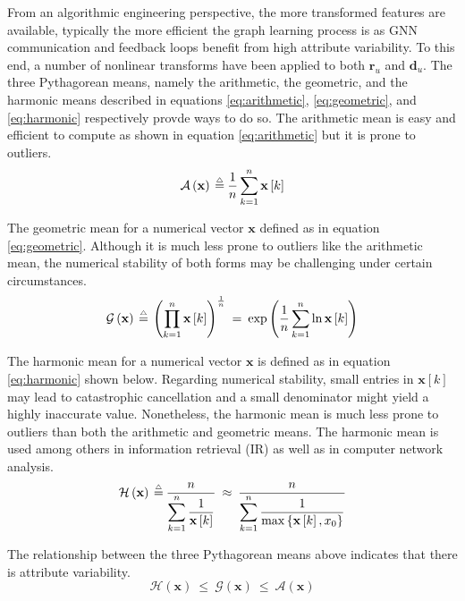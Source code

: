 \documentclass[conference, compsoc, final]{IEEEtran}
\newcommand{\bmdef}{{\buildrel{{\mathsmaller{\triangle}}}\over{=}}}
\newcommand{\bmparen}[1]{\left({#1}\right)}
\newcommand{\bmvec}[1]{\mathbf{#1}}
\newcommand{\bmindex}[1]{\left[{#1}\right]}
\newcommand{\bmAmean}[1]{\mathcal{A}\left(#1\right)}
\newcommand{\bmGmean}[1]{\mathcal{G}\left(#1\right)}
\newcommand{\bmHmean}[1]{\mathcal{H}\left(#1\right)}
\begin{document}
From an algorithmic engineering perspective, the more transformed features are available, typically the more efficient the graph learning process is as GNN communication and feedback loops benefit from high attribute variability. To this end, a number of nonlinear transforms have been applied to both $\bmvec{r}_u$ and $\bmvec{d}_u$. The three Pythagorean means, namely the arithmetic, the geometric, and the harmonic means described in equations \eqref{eq:arithmetic}, \eqref{eq:geometric}, and \eqref{eq:harmonic} respectively provde ways to do so. The arithmetic mean is easy and efficient to compute as shown in equation \eqref{eq:arithmetic} but it is prone to outliers.
\begin{equation}
\bmAmean{\bmvec{x}}  \:\bmdef\:
    \frac{1}{n}\sum_{k=1}^{n}\bmvec{x}\bmindex{k}
\label{eq:arithmetic}
\end{equation}

The geometric mean for a numerical vector $\bmvec{x}$ defined as in equation \eqref{eq:geometric}. Although it is much less prone to outliers like the arithmetic mean, the numerical stability of both forms may be challenging under certain circumstances.
\begin{equation}
\bmGmean{\bmvec{x}}  \:\bmdef\:
    \bmparen{\prod_{k=1}^{n}\bmvec{x}\bmindex{k}}^{\frac{1}{n}}  \:=\:
    \exp\bmparen{\frac{1}{n}\sum_{k=1}^{n}\ln{\bmvec{x}\bmindex{k}}}
\label{eq:geometric}
\end{equation}

The harmonic mean for a numerical vector $\bmvec{x}$ is defined as in equation \eqref{eq:harmonic} shown below. Regarding numerical stability, small entries in $\bmvec{x}\bmindex{k}$ may lead to catastrophic cancellation and a small denominator might yield a highly inaccurate value. Nonetheless, the harmonic mean is much less prone to outliers than both the arithmetic and geometric means. The harmonic mean is used among others in information retrieval (IR) as well as in computer network analysis.
\begin{equation}
\bmHmean{\bmvec{x}}  \:\bmdef\:
    \frac{\displaystyle n}{\displaystyle \sum_{k=1}^{n}\frac{1}{\bmvec{x}\bmindex{k}}}  \:\approx\:
    \frac{\displaystyle n}{\displaystyle \sum_{k=1}^{n}\frac{1}{\max\left\lbrace \bmvec{x}\bmindex{k}, x_0 \right\rbrace}} 
\label{eq:harmonic}
\end{equation}

The relationship between the three Pythagorean means above indicates that there is attribute variability.
\begin{equation}
\bmHmean{\bmvec{x}}  \:\leq\:
    \bmGmean{\bmvec{x}}  \:\leq\:
    \bmAmean{\bmvec{x}}
\end{equation}
\end{document}
